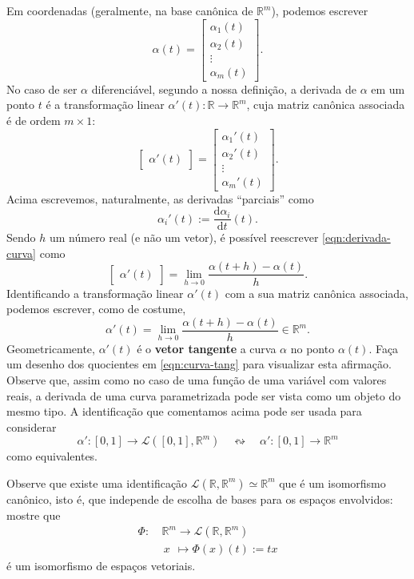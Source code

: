 Em coordenadas (geralmente, na base canônica de $\mathbb{R}^m$), podemos escrever
\[
\alpha (t) = 
\begin{bmatrix}
\alpha_1 (t) \\  \alpha_2 (t) \\ \vdots \\  \alpha_m (t)
\end{bmatrix}.
\] No caso de ser $\alpha$ diferenciável, segundo a nossa definição, a derivada de $\alpha$ em um ponto $t$ é a transformação linear $\alpha'(t): \mathbb{R} \to \mathbb{R}^m$, cuja matriz canônica associada é de ordem $m\times 1$:
\begin{equation}\label{eqn:derivada-curva}
\begin{bmatrix}
\alpha' (t)
\end{bmatrix} = 
\begin{bmatrix}
\alpha_1' (t) \\  \alpha_2' (t) \\ \vdots \\  \alpha_m' (t)
\end{bmatrix}.
\end{equation} Acima escrevemos, naturalmente, as derivadas ``parciais'' como
\[
\alpha_i' (t) := \frac{\mathrm{d}  \alpha_i}{\mathrm{d}  t} (t).
\] Sendo $h$ um número real (e não um vetor), é possível reescrever \eqref{eqn:derivada-curva} como
\[
\begin{bmatrix}
\alpha' (t)
\end{bmatrix} = \lim_{h \to 0} \frac{\alpha (t + h) - \alpha (t)}{h}.
\] Identificando a transformação linear $\alpha'(t)$ com a sua matriz canônica associada, podemos escrever, como de costume,
\begin{equation}\label{eqn:curva-tang}
\alpha'(t)  = \lim_{h \to 0} \frac{\alpha (t + h) - \alpha (t)}{h} \in \mathbb{R}^m.
\end{equation} Geometricamente, $\alpha'(t)$ é o \textbf{vetor tangente} a curva $\alpha$ no ponto $\alpha(t)$. Faça um desenho dos quocientes em \eqref{eqn:curva-tang} para visualizar esta afirmação. Observe que, assim como no caso de uma função de uma variável com valores reais, a derivada de uma curva parametrizada pode ser vista como um objeto do mesmo tipo. A identificação que comentamos acima pode ser usada para considerar
\[
\alpha':[0,1] \to \mathcal{L}([0,1],\mathbb{R}^m) \quad \leftrightsquigarrow \quad \alpha':[0,1] \to \mathbb{R}^m
\] como equivalentes.

\begin{exer}
	Observe que existe uma identificação $\mathcal{L}(\mathbb{R}, \mathbb{R}^m) \simeq \mathbb{R}^m$ que é um isomorfismo canônico, isto é, que independe de escolha de bases para os espaços envolvidos: mostre que
	\[
	\begin{split}
	\Phi: & \ \mathbb{R}^m \to \mathcal{L}(\mathbb{R}, \mathbb{R}^m) \\
	& \ \, x \ \ \mapsto  \Phi(x)(t) := tx
	\end{split}
	\] é um isomorfismo de espaços vetoriais.
\end{exer}

